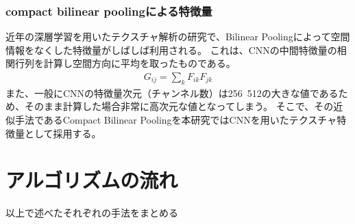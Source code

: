 \subsubsection{compact bilinear poolingによる特徴量}
近年の深層学習を用いたテクスチャ解析の研究で、Bilinear Poolingによって空間情報をなくした特徴量がしばしば利用される。
これは、CNNの中間特徴量の相関行列を計算し空間方向に平均を取ったものである。
\begin{eqnarray}
G_{ij} = \sum_k{F_{ik} F_{jk}}
\end{eqnarray}
また、一般にCNNの特徴量次元（チャンネル数）は256~512の大きな値であるため、そのまま計算した場合非常に高次元な値となってしまう。
そこで、その近似手法であるCompact Bilinear Pooling\cite{gao2016compact}を本研究ではCNNを用いたテクスチャ特徴量として採用する。

\section{アルゴリズムの流れ}
以上で述べたそれぞれの手法をまとめる



